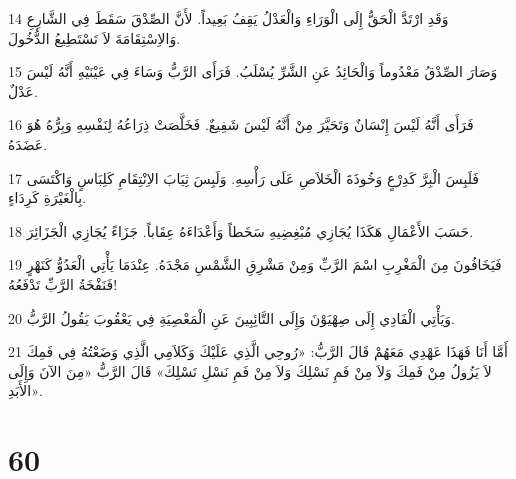 \par 14 وَقَدِ ارْتَدَّ الْحَقُّ إِلَى الْوَرَاءِ وَالْعَدْلُ يَقِفُ بَعِيداً. لأَنَّ الصِّدْقَ سَقَطَ فِي الشَّارِعِ وَالاِسْتِقَامَةَ لاَ تَسْتَطِيعُ الدُّخُولَ.
\par 15 وَصَارَ الصِّدْقُ مَعْدُوماً وَالْحَائِدُ عَنِ الشَّرِّ يُسْلَبُ. فَرَأَى الرَّبُّ وَسَاءَ فِي عَيْنَيْهِ أَنَّهُ لَيْسَ عَدْلٌ.
\par 16 فَرَأَى أَنَّهُ لَيْسَ إِنْسَانٌ وَتَحَيَّرَ مِنْ أَنَّهُ لَيْسَ شَفِيعٌ. فَخَلَّصَتْ ذِرَاعُهُ لِنَفْسِهِ وَبِرُّهُ هُوَ عَضَدَهُ.
\par 17 فَلَبِسَ الْبِرَّ كَدِرْعٍ وَخُوذَةَ الْخَلاَصِ عَلَى رَأْسِهِ. وَلَبِسَ ثِيَابَ الاِنْتِقَامِ كَلِبَاسٍ وَاكْتَسَى بِالْغَيْرَةِ كَرِدَاءٍ.
\par 18 حَسَبَ الأَعْمَالِ هَكَذَا يُجَازِي مُبْغِضِيهِ سَخَطاً وَأَعْدَاءَهُ عِقَاباً. جَزَاءً يُجَازِي الْجَزَائِرَ.
\par 19 فَيَخَافُونَ مِنَ الْمَغْرِبِ اسْمَ الرَّبِّ وَمِنْ مَشْرِقِ الشَّمْسِ مَجْدَهُ. عِنْدَمَا يَأْتِي الْعَدُوُّ كَنَهْرٍ فَنَفْخَةُ الرَّبِّ تَدْفَعُهُ!
\par 20 وَيَأْتِي الْفَادِي إِلَى صِهْيَوْنَ وَإِلَى التَّائِبِينَ عَنِ الْمَعْصِيَةِ فِي يَعْقُوبَ يَقُولُ الرَّبُّ.
\par 21 أَمَّا أَنَا فَهَذَا عَهْدِي مَعَهُمْ قَالَ الرَّبُّ: «رُوحِي الَّذِي عَلَيْكَ وَكَلاَمِي الَّذِي وَضَعْتُهُ فِي فَمِكَ لاَ يَزُولُ مِنْ فَمِكَ وَلاَ مِنْ فَمِ نَسْلِكَ وَلاَ مِنْ فَمِ نَسْلِ نَسْلِكَ» قَالَ الرَّبُّ «مِنَ الآنَ وَإِلَى الأَبَدِ».

\chapter{60}

